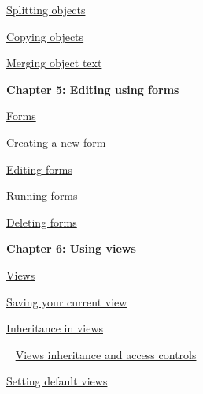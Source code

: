 \documentclass[11pt,a4paper]{article}
\begin{document}
\href{https://www.ibm.com/support/knowledgecenter/search/Splitting%20objects?scope=SSYQBZ_9.6.1}{Splitting objects}

\href{https://www.ibm.com/support/knowledgecenter/search/Copying%20objects?scope=SSYQBZ_9.6.1}{Copying objects}

\href{https://www.ibm.com/support/knowledgecenter/search/Merging%20object%20text?scope=SSYQBZ_9.6.1}{Merging object text} \\



\begin{Large}\textbf{Chapter 5: Editing using forms} \end{Large} 
\vspace{1mm}

\href{https://www.ibm.com/support/knowledgecenter/search/Forms?scope=SSYQBZ_9.6.1}{Forms}

\href{https://www.ibm.com/support/knowledgecenter/search/Creating%20a%20new%20form?scope=SSYQBZ_9.6.1}{Creating a new form}

\href{https://www.ibm.com/support/knowledgecenter/search/Editing%20forms?scope=SSYQBZ_9.6.1}{Editing forms}

\href{https://www.ibm.com/support/knowledgecenter/search/Running%20forms?scope=SSYQBZ_9.6.1}{Running forms}

\href{https://www.ibm.com/support/knowledgecenter/search/Deleting%20forms?scope=SSYQBZ_9.6.1}{Deleting forms} \\



\begin{Large}\textbf{Chapter 6: Using views} \end{Large} 
\vspace{1mm}

\href{https://www.ibm.com/support/knowledgecenter/search/Views?scope=SSYQBZ_9.6.1}{Views}

\href{https://www.ibm.com/support/knowledgecenter/search/Saving%20your%20current%20view?scope=SSYQBZ_9.6.1}{Saving your current view}

\href{https://www.ibm.com/support/knowledgecenter/search/Inheritance%20in%20views?scope=SSYQBZ_9.6.1}{Inheritance in views}

\,\,\, \href{https://www.ibm.com/support/knowledgecenter/search/Views%20inheritance%20and%20access%20controls?scope=SSYQBZ_9.6.1}{Views inheritance and access controls}

\href{https://www.ibm.com/support/knowledgecenter/search/Setting%20default%20views?scope=SSYQBZ_9.6.1}{Setting default views}
\end{document}
